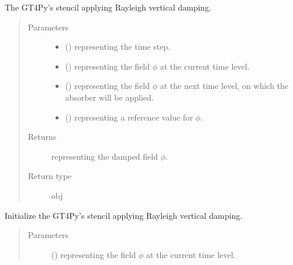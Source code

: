 \documentclass[letterpaper,10pt,english]{sphinxmanual}
\begin{document}
\begin{fulllineitems}
\begin{fulllineitems}
\label{\detokenize{api:dycore.vertical_damping.Rayleigh._defs_stencil}}
The GT4Py’s stencil applying Rayleigh vertical damping.
\begin{quote}\begin{description}
\item[{Parameters}] \leavevmode\begin{itemize}
\item {} 
 () \textendash{}  representing the time step.

\item {} 
 () \textendash{}  representing the field \(\phi\) at the current time level.

\item {} 
 () \textendash{}  representing the field \(\phi\) at the next time level, on
which the absorber will be applied.

\item {} 
 () \textendash{}  representing a reference value for \(\phi\).

\end{itemize}

\item[{Returns}] \leavevmode
{} representing the damped field \(\phi\).

\item[{Return type}] \leavevmode
obj

\end{description}\end{quote}

\end{fulllineitems}


\begin{fulllineitems}
\label{\detokenize{api:dycore.vertical_damping.Rayleigh._initialize_stencil}}
Initialize the GT4Py’s stencil applying Rayleigh vertical damping.
\begin{quote}\begin{description}
\item[{Parameters}] \leavevmode
{} () \textendash{}  representing the field \(\phi\) at the current time level.


\end{description}
\end{quote}
\end{fulllineitems}
\end{fulllineitems}
\end{document}
